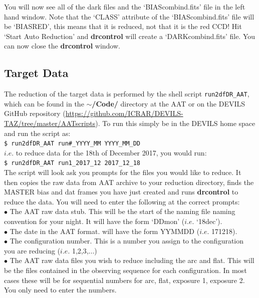 \documentclass[12pt]{article}
\begin{document}
You will now see all of the dark files and the `BIAScombind.fits' file in the left hand window. Note that the `CLASS' attribute of the `BIAScombind.fits' file will be `BIASRED', this means that it is reduced, not that it is the red CCD! Hit `Start Auto Reduction' and \textbf{drcontrol} will create a `DARKcombind.fits' file.  You can now close the \textbf{drcontrol} window.
 

\subsection{Target Data}

The reduction of the target data is performed by the shell script \texttt{run2dfDR\_AAT}, which can be found in the \textbf{$\sim$/Code/} directory at the AAT or on the DEVILS GitHub repository (\url{https://github.com/ICRAR/DEVILS-TAZ/tree/master/AATscripts}). To run this simply be in the DEVILS home space and run the script as:\\

\texttt{\$ run2dfDR\_AAT run\#\_YYYY\_MM YYYY\_MM\_DD}\\

$i.e.$ to reduce data for the 18th of December 2017, you would run:\\    

\texttt{\$ run2dfDR\_AAT run1\_2017\_12 2017\_12\_18}\\

The script will look ask you prompts for the files you would like to reduce. It then copies the raw data from AAT archive to your reduction directory, finds the MASTER bias and dat frames you have just created and runs \textbf{drcontrol} to reduce the data. You will need to enter the following at the correct prompts:\\

$\bullet$ The AAT raw data stub. This will be the start of the naming file naming convention for your night. It will have the form `DDmon' ($i.e.$ `18dec').\\
$\bullet$ The date in the AAT format. will have the form YYMMDD ($i.e.$ 171218).\\
$\bullet$ The configuration number. This is a number you assign to the configuration you are reducing ($i.e.$ 1,2,3,...)\\
$\bullet$ The AAT raw data files you wish to reduce including the arc and flat. This will be the files contained in the observing sequence for each configuration. In most cases these will be for sequential numbers for arc, flat, exposure 1, exposure 2. You only need to enter the numbers.\\
\end{document}
